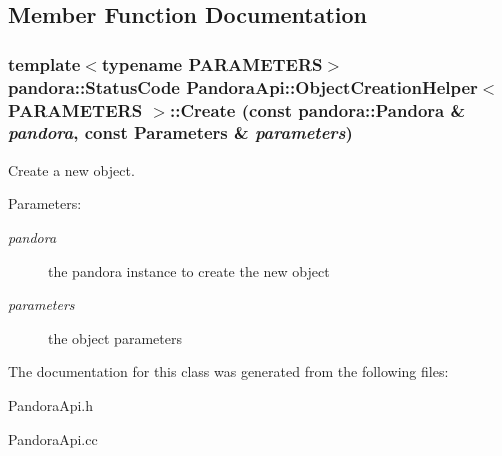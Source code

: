 \subsection{Member Function Documentation}
\subsubsection{\setlength{\rightskip}{0pt plus 5cm}template$<$typename PARAMETERS$>$ pandora::Status\-Code \bf{Pandora\-Api::Object\-Creation\-Helper}$<$ PARAMETERS $>$::Create (const \bf{pandora::Pandora} \& {\em pandora}, const Parameters \& {\em parameters})\hspace{0.3cm}{\tt  [static]}}\label{classPandoraApi_1_1ObjectCreationHelper_7e04288a8dfc94c204a384e3d723e278}


Create a new object. 

\begin{Desc}
\item[Parameters:]
\begin{description}
\item[{\em pandora}]the pandora instance to create the new object \item[{\em parameters}]the object parameters \end{description}
\end{Desc}


The documentation for this class was generated from the following files:\begin{CompactItemize}
\item 
Pandora\-Api.h\item 
Pandora\-Api.cc\end{CompactItemize}
